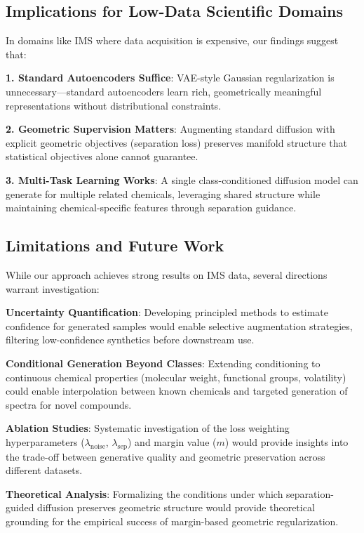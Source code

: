 \documentclass[sigconf]{acmart}
\begin{document}
\subsection{Implications for Low-Data Scientific Domains}

In domains like IMS where data acquisition is expensive, our findings suggest that:

\textbf{1. Standard Autoencoders Suffice}: VAE-style Gaussian regularization is unnecessary—standard autoencoders learn rich, geometrically meaningful representations without distributional constraints.

\textbf{2. Geometric Supervision Matters}: Augmenting standard diffusion with explicit geometric objectives (separation loss) preserves manifold structure that statistical objectives alone cannot guarantee.

\textbf{3. Multi-Task Learning Works}: A single class-conditioned diffusion model can generate for multiple related chemicals, leveraging shared structure while maintaining chemical-specific features through separation guidance.

\subsection{Limitations and Future Work}

While our approach achieves strong results on IMS data, several directions warrant investigation:

\textbf{Uncertainty Quantification}: Developing principled methods to estimate confidence for generated samples would enable selective augmentation strategies, filtering low-confidence synthetics before downstream use.

\textbf{Conditional Generation Beyond Classes}: Extending conditioning to continuous chemical properties (molecular weight, functional groups, volatility) could enable interpolation between known chemicals and targeted generation of spectra for novel compounds.

\textbf{Ablation Studies}: Systematic investigation of the loss weighting hyperparameters ($\lambda_{\text{noise}}$, $\lambda_{\text{sep}}$) and margin value ($m$) would provide insights into the trade-off between generative quality and geometric preservation across different datasets.

\textbf{Theoretical Analysis}: Formalizing the conditions under which separation-guided diffusion preserves geometric structure would provide theoretical grounding for the empirical success of margin-based geometric regularization.
\end{document}
